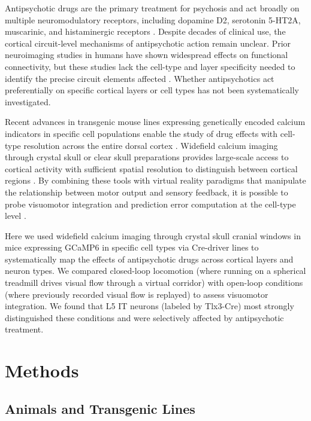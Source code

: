 \documentclass[11pt]{article}
\begin{document}
Antipsychotic drugs are the primary treatment for psychosis and act broadly on multiple neuromodulatory receptors, including dopamine D2, serotonin 5-HT2A, muscarinic, and histaminergic receptors \citep{kapur2001,meltzer2013}. Despite decades of clinical use, the cortical circuit-level mechanisms of antipsychotic action remain unclear. Prior neuroimaging studies in humans have shown widespread effects on functional connectivity, but these studies lack the cell-type and layer specificity needed to identify the precise circuit elements affected \citep{honey2004}. Whether antipsychotics act preferentially on specific cortical layers or cell types has not been systematically investigated.

Recent advances in transgenic mouse lines expressing genetically encoded calcium indicators in specific cell populations enable the study of drug effects with cell-type resolution across the entire dorsal cortex \citep{dana2019,madisen2015}. Widefield calcium imaging through crystal skull or clear skull preparations provides large-scale access to cortical activity with sufficient spatial resolution to distinguish between cortical regions \citep{mohajerani2013,musall2019}. By combining these tools with virtual reality paradigms that manipulate the relationship between motor output and sensory feedback, it is possible to probe visuomotor integration and prediction error computation at the cell-type level \citep{keller2012}.

Here we used widefield calcium imaging through crystal skull cranial windows in mice expressing GCaMP6 in specific cell types via Cre-driver lines to systematically map the effects of antipsychotic drugs across cortical layers and neuron types. We compared closed-loop locomotion (where running on a spherical treadmill drives visual flow through a virtual corridor) with open-loop conditions (where previously recorded visual flow is replayed) to assess visuomotor integration. We found that L5 IT neurons (labeled by Tlx3-Cre) most strongly distinguished these conditions and were selectively affected by antipsychotic treatment.

\section{Methods}

\subsection{Animals and Transgenic Lines}
\end{document}

